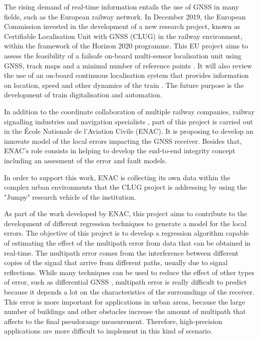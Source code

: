\documentclass[a4paper, report, oneside, UKenglish]{memoir}
\begin{document}
The rising demand of real-time information entails the use of GNSS in many fields, such as the European railway network. In December 2019, the European Commission invested in the development of a new research project, known as Certifiable Localisation Unit with GNSS  (CLUG) in the railway environment, within the framework of the Horizon 2020 programme. This EU project aims to assess the feasibility of a failsafe on-board multi-sensor localisation unit using GNSS, track maps and a minimal number of reference points \cite{CORDISwebsite}. It will also review the use of an on-board continuous localisation system that provides information on location, speed and other dynamics of the train \cite{CORDISwebsite}. The future purpose is the development of train digitalisation and automation. 

In addition to the coordinate collaboration of multiple railway companies, railway signalling industries and navigation specialists \cite{CORDISwebsite}, part of this project is carried out in the École Nationale de l'Aviation Civile (ENAC). It is proposing to develop an innovate model of the local errors impacting the GNSS receiver. Besides that, ENAC's role consists in helping to develop the end-to-end integrity concept including an assesment of the error and fault models.  

In order to support this work, ENAC is collecting its own data within the complex urban environments that the CLUG project is addressing by using the "Jumpy" research vehicle of the institution.

As part of the work developed by ENAC, this project aims to contribute to the development of different regression techniques to generate a model for the local errors. The objective of this project is to develop a regression algorithm capable of estimating the effect of the multipath error from data that can be obtained in real-time. The multipath error comes from the interference between different copies of the signal that arrive from different paths, usually due to signal reflections. While many techniques can be used to reduce the effect of other types of error, such as differential GNSS \cite{kaplan_understanding_2006}, multipath error is really difficult to predict because it depends a lot on the characteristics of the surroundings of the receiver. This error is more important for applications in urban areas, because the large number of buildings and other obstacles increase the amount of multipath that affects to the final pseudorange measurement. Therefore, high-precision applications are more difficult to implement in this kind of scenario. 
\end{document}
